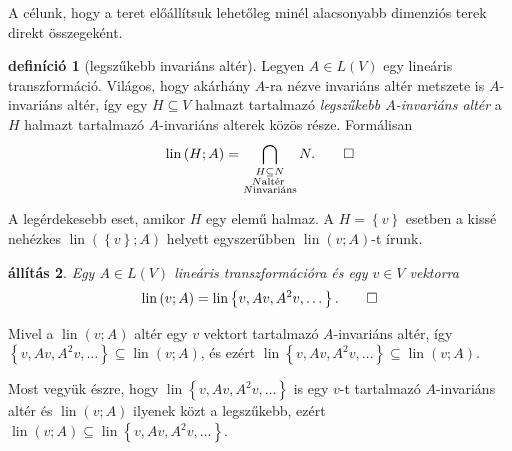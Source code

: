 \documentclass[a4paper, showtrims]{memoir}
\makeatletter
\renewenvironment{proof}[1][\proofname]
    {\par\pushQED{\qed}%
    \normalfont \topsep6\p@\@plus6\p@\relax
    \trivlist
    \item[\hskip\labelsep
        \itshape
    #1\@addpunct{:}]\ignorespaces}
    {\popQED\endtrivlist\@endpefalse}
\theoremstyle{plain}
\newtheorem{proposition}{állítás}[chapter]
\theoremstyle{remark}
\theoremstyle{definition}
\newtheorem{definition}[proposition]{definíció}
\DeclareMathOperator{\lin}{lin}
\makeatother
\begin{document}
A célunk, hogy a teret előállítsuk lehetőleg minél alacsonyabb dimenziós terek direkt összegeként.

\begin{definition}[legszűkebb invariáns altér]
	Legyen $A\in L\left( V \right)$ egy lineáris transzformáció.
	Világos, hogy akárhány $A$-ra nézve invariáns altér metszete is $A$-invariáns altér,
	így egy $H\subseteq V$ halmazt tartalmazó
	\emph{legszűkebb $A$-invariáns altér}
	a $H$ halmazt tartalmazó $A$-invariáns alterek közös része.
	Formálisan
	\[
		\lin\left( H;A \right)
		=
		\bigcap_{
			\substack{
				H\subseteq N\\
				N\text{altér }\\
				N\text{invariáns}}
		}N.\qedhere
	\]
\end{definition}
A legérdekesebb eset, amikor $H$ egy elemű halmaz.
A $H=\left\{ v \right\}$ esetben a kissé nehézkes
$\lin\left( \left\{ v \right\};A \right)$ helyett egyszerűbben $\lin\left( v;A \right)$-t írunk.

\begin{proposition}
	Egy $A\in L\left( V \right)$ lineáris transzformációra és egy $v\in V$ vektorra
	\[
		\lin\left( v;A \right)
		=
		\lin\left\{ v,Av,A^2v,\dots \right\}.\qedhere
	\]
\end{proposition}
\begin{proof}
	Mivel a $\lin\left( v;A \right)$ altér egy $v$ vektort tartalmazó $A$-invariáns altér,
	így $\left\{ v,Av,A^2v,\dots \right\}\subseteq \lin\left( v;A \right)$,
	és ezért
	\(
		\lin\left\{ v,Av,A^2v,\dots \right\}
		\subseteq
		\lin\left( v;A \right).
	\)

	Most vegyük észre, hogy
	\begin{math}
		\lin\left\{ v,Av,A^2v,\dots \right\}
	\end{math}
	is egy $v$-t tartalmazó $A$-invariáns altér és $\lin\left( v;A \right)$ ilyenek közt a legszűkebb, ezért
	\(
		\lin\left( v;A \right)
		\subseteq
		\lin\left\{ v,Av,A^2v,\dots \right\}.
	\)
\end{proof}
\end{document}
